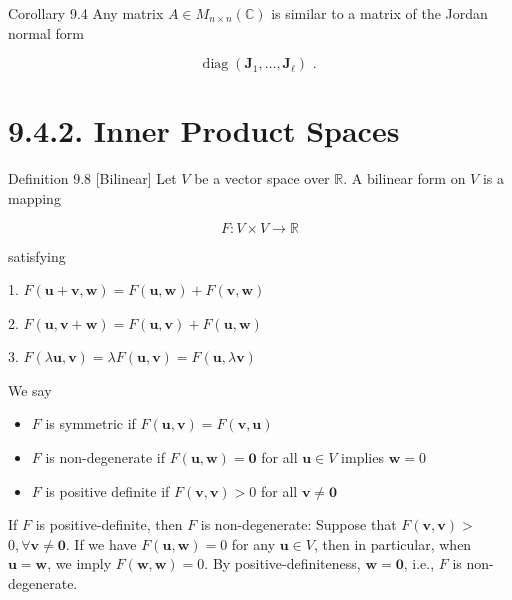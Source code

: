 \documentclass[11pt]{article}
\begin{document}
Corollary 9.4 Any matrix \(A \in  {M}_{n \times  n}\left( \mathbb{C}\right)\) is similar to a matrix of the Jordan normal form

\[
\operatorname{diag}\left( {{\mathbf{J}}_1,\ldots ,{\mathbf{J}}_{\ell }}\right) \text{ . }
\]

\section*{9.4.2. Inner Product Spaces}

Definition 9.8 [Bilinear] Let \(V\) be a vector space over \(\mathbb{R}\). A bilinear form on \(V\) is a mapping

\[
F : V \times  V \rightarrow  \mathbb{R}
\]

satisfying

1. \(F\left( {\mathbf{u} + \mathbf{v},\mathbf{w}}\right)  = F\left( {\mathbf{u},\mathbf{w}}\right)  + F\left( {\mathbf{v},\mathbf{w}}\right)\)

2. \(F\left( {\mathbf{u},\mathbf{v} + \mathbf{w}}\right)  = F\left( {\mathbf{u},\mathbf{v}}\right)  + F\left( {\mathbf{u},\mathbf{w}}\right)\)

3. \(F\left( {\lambda \mathbf{u},\mathbf{v}}\right)  = {\lambda F}\left( {\mathbf{u},\mathbf{v}}\right)  = F\left( {\mathbf{u},\lambda \mathbf{v}}\right)\)

We say

\begin{itemize}
\item \(F\) is symmetric if \(F\left( {\mathbf{u},\mathbf{v}}\right)  = F\left( {\mathbf{v},\mathbf{u}}\right)\)
\end{itemize}

\begin{itemize}
\item \(F\) is non-degenerate if \(F\left( {\mathbf{u},\mathbf{w}}\right)  = \mathbf{0}\) for all \(\mathbf{u} \in  V\) implies \(\mathbf{w} = 0\)
\end{itemize}

\begin{itemize}
\item \(F\) is positive definite if \(F\left( {\mathbf{v},\mathbf{v}}\right)  > 0\) for all \(\mathbf{v} \neq  \mathbf{0}\)
\end{itemize}

If \(F\) is positive-definite, then \(F\) is non-degenerate: Suppose that \(F\left( {\mathbf{v},\mathbf{v}}\right)  >\)  \(0,\forall \mathbf{v} \neq  \mathbf{0}\). If we have \(F\left( {\mathbf{u},\mathbf{w}}\right)  = 0\) for any \(\mathbf{u} \in  V\), then in particular, when \(\mathbf{u} = \mathbf{w}\), we imply \(F\left( {\mathbf{w},\mathbf{w}}\right)  = 0\). By positive-definiteness, \(\mathbf{w} = \mathbf{0}\), i.e., \(F\) is non-degenerate.
\end{document}
